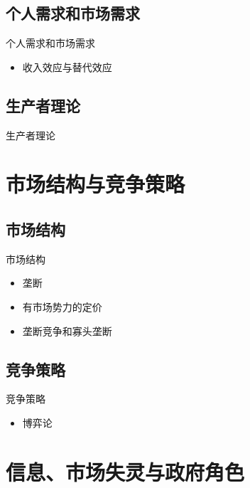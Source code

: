 \documentclass[UTF8]{ctexbeamer}
\begin{document}
\subsection{个人需求和市场需求}
\begin{frame}{个人需求和市场需求}
\begin{itemize}
\item 收入效应与替代效应
\end{itemize}
\end{frame}


\subsection{生产者理论}
\begin{frame}{生产者理论}
\end{frame}

\section{市场结构与竞争策略}

\subsection{市场结构}
\begin{frame}{市场结构}
\begin{itemize}
\item 垄断
\item 有市场势力的定价
\item 垄断竞争和寡头垄断
\end{itemize}
\end{frame}


\subsection{竞争策略}
\begin{frame}{竞争策略}
\begin{itemize}
\item 博弈论
\end{itemize}
\end{frame}

\section{ 信息、市场失灵与政府角色}
\end{document}
